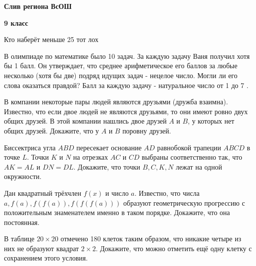 \centerline{\bf \Huge Слив региона ВсОШ}
\centerline{\bf \Huge 9 класс}

\begin{flushright}
        \scriptsize{Кто наберёт меньше 25 тот лох}
\end{flushright}

В олимпиаде по математике было 10 задач. За каждую задачу Ваня получил хотя бы 1 балл. Он утверждает, что среднее арифметическое его баллов за любые несколько (хотя бы две) подряд идущих задач - нецелое число. Могли ли его слова оказаться правдой? Балл за каждую задачу - натуральное число от 1 до 7 .


В компании некоторые пары людей являются друзьями (дружба взаимна). Известно, что если двое людей не являются друзьями, то они имеют ровно двух общих друзей. В этой компании нашлись двое друзей $A$ и $B$, у которых нет общих друзей. Докажите, что у $A$ и $B$ поровну друзей.

Биссектриса угла $A B D$ пересекает основание $A D$ равнобокой трапеции $A B C D$ в точке $L$. Точки $K$ и $N$ на отрезках $A C$ и $C D$ выбраны соответственно так, что $A K=A L$ и $D N=D L$. Докажите, что точки $B, C, K, N$ лежат на одной окружности.

Дан квадратный трёхчлен $f(x)$ и число $a$. Известно, что числа $a, f(a), f(f(a)), f(f(f(a)))$ образуют геометрическую прогрессию с положительным знаменателем именно в таком порядке. Докажите, что она постоянная.

В таблице $20 \times 20$ отмечено 180 клеток таким образом, что никакие четыре из них не образуют квадрат $2 \times 2$. Докажите, что можно отметить ещё одну клетку с сохранением этого условия.